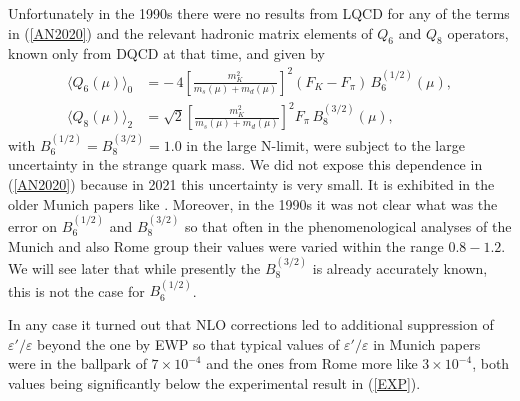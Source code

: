 \documentclass[12pt,a4paper]{article}
\newcommand{\bsi}{B_6^{(1/2)}}
\newcommand{\bei}{B_8^{(3/2)}}
\def\epe{\varepsilon'/\varepsilon}
\begin{document}
Unfortunately in the 1990s there were no results from LQCD for any of the terms in (\ref{AN2020}) and the relevant hadronic matrix elements
of $Q_6$ and $Q_8$ operators, known only from DQCD at that time, and given by \cite{Buras:1985yx,Buras:1987wc} 
\begin{align}
  \label{eq:Q60}
  \langle Q_6(\mu) \rangle_0 &
  = -\,4  \left[\frac{m_K^2}{m_s(\mu) + m_d(\mu)}\right]^2 (F_K - F_\pi)
    \,\bsi(\mu) ,
\\
  \label{eq:Q82}
  \langle Q_8(\mu) \rangle_2 &
  = \sqrt{2} 
  \left[ \frac{m_K^2}{m_s(\mu) + m_d(\mu)} \right]^2 F_\pi \,\bei(\mu) ,
\end{align}
with $\bsi=\bei=1.0$ in the large N-limit,
were subject
to the large uncertainty in the strange quark mass.
We did not
expose this dependence in (\ref{AN2020}) because in 2021 this uncertainty
is very small.
It is exhibited in the older Munich papers like \cite{Buras:1996dq,Buras:2003zz}. Moreover, in the 1990s it was not clear what was the error on $\bsi$ and $\bei$ so
that often in the phenomenological analyses of the Munich and also Rome
group \cite{Ciuchini:1995cd} their values were varied
within the range $0.8-1.2$.  We will see later that while presently the
$\bei$ is already accurately known, this is not the case for $\bsi$.

In any case it turned out that NLO corrections led to additional suppression of $\epe$ beyond the one by EWP so that typical
values of $\epe$ in Munich papers
  were in the ballpark of $7\times 10^{-4}$
and the ones from Rome more like $3\times 10^{-4}$, both values being
significantly below the experimental result in (\ref{EXP}).
\end{document}
